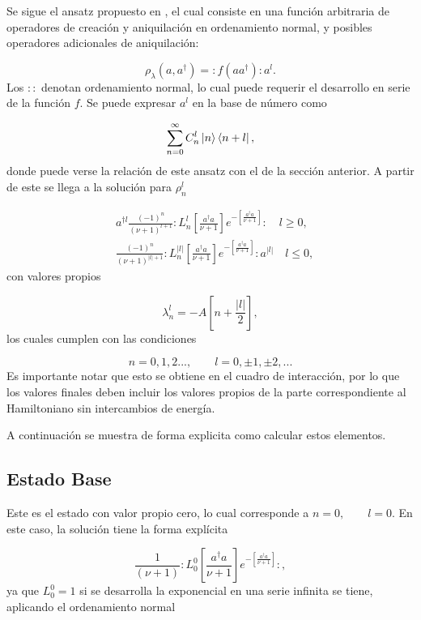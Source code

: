 \documentclass[a4paper,10pt]{report}
\begin{document}
Se sigue el ansatz propuesto en \cite{EnglertDB}, el cual consiste en una función arbitraria de operadores de creación y aniquilación en ordenamiento normal, y posibles operadores adicionales de aniquilación:

\begin{equation}\label{Englert1993}
\rho_\lambda (a,a^\dagger) = :f(aa^\dagger):a^l.
\end{equation} Los $::$ denotan ordenamiento normal, lo cual puede requerir el desarrollo en serie de la función $f$. Se puede expresar $a^l$ en la base de número como

\begin{equation}
\sum_{n=0}^\infty C_n^l\Ket{n}\Bra{n+l},
\end{equation} donde puede verse la relación de este ansatz con el de la sección anterior. A partir de este se llega a la solución para $\rho_n^l$ \cite{EnglertDB}

\begin{align}\label{DefDB}
&a^{\dagger l}\frac{(-1)^n}{(\nu+1)^{l+1}}:L_n^l[\frac{a^\dagger a}{\nu+1}]e^{-[\frac{a^\dagger a}{\nu+1}]}:\quad l \geq 0, \\
&\frac{(-1)^n}{(\nu+1)^{|l|+1}}:L_n^{|l|}[\frac{a^\dagger a}{\nu+1}]e^{-[\frac{a^\dagger a}{\nu+1}]}:a^{|l|}\quad l \leq 0,
\end{align} con valores propios

\begin{equation}
\lambda_n^l = -A[n + \frac{|l|}{2}],
\end{equation} los cuales cumplen con las condiciones

\begin{equation}
n=0,1,2...,\qquad l = 0,\pm 1, \pm 2,... 
\end{equation}Es importante notar que esto se obtiene en el cuadro de interacción, por lo que los valores finales deben incluir los valores propios de la parte correspondiente al Hamiltoniano sin intercambios de energía.

A continuación se muestra de forma explicita como calcular estos elementos. 

\subsection{Estado Base}

Este es el estado con valor propio cero, lo cual corresponde a $n=0, \qquad l=0$. En este caso, la solución tiene la forma explícita

\begin{equation}
\frac{1}{(\nu+1)}:L_0^0[\frac{a^\dagger a}{\nu+1}]e^{-[\frac{a^\dagger a}{\nu+1}]}:,
\end{equation} ya que $L_0^0 = 1$ \cite{ArfkenMM} si se desarrolla la exponencial en una serie infinita se tiene, aplicando el ordenamiento normal
\end{document}
